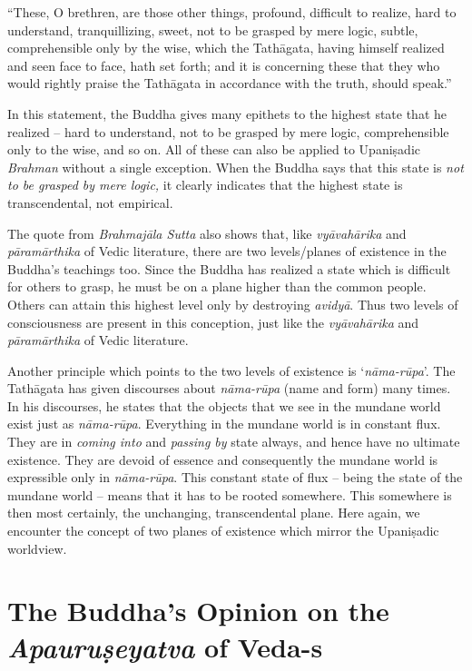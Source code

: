 \begin{myquote}
“These, O brethren, are those other things, profound, difficult to realize, hard to understand, tranquillizing, sweet, not to be grasped by mere logic, subtle, comprehensible only by the wise, which the Tathāgata, having himself realized and seen face to face, hath set forth; and it is concerning these that they who would rightly praise the Tathāgata in accordance with the truth, should speak.”
\end{myquote}

In this statement, the Buddha gives many epithets to the highest state that he realized – hard to understand, not to be grasped by mere logic, comprehensible only to the wise, and so on. All of these can also be applied to Upaniṣadic \textit{Brahman} without a single exception. When the Buddha says that this state is \textit{not to be grasped by mere logic,} it clearly indicates that the highest state is transcendental, not empirical.

The quote from \textit{Brahmajāla Sutta} also shows that, like \textit{vyāvahārika} and \textit{pāramārthika} of Vedic literature, there are two levels/planes of existence in the Buddha’s teachings too. Since the Buddha has realized a state which is difficult for others to grasp, he must be on a plane higher than the common people. Others can attain this highest level only by destroying \textit{avidyā}. Thus two levels of consciousness are present in this conception, just like the \textit{vyāvahārika} and \textit{pāramārthika} of Vedic literature.

Another principle which points to the two levels of existence is ‘\textit{nāma-rūpa}’. The Tathāgata has given discourses about \textit{nāma-rūpa} (name and form) many times. In his discourses, he states that the objects that we see in the mundane world exist just as \textit{nāma-rūpa}. Everything in the mundane world is in constant flux. They are in \textit{coming into} and \textit{passing by} state always, and hence have no ultimate existence. They are devoid of essence and consequently the mundane world is expressible only in \textit{nāma-rūpa}. This constant state of flux – being the state of the mundane world – means that it has to be rooted somewhere. This somewhere is then most certainly, the unchanging, transcendental plane. Here again, we encounter the concept of two planes of existence which mirror the Upaniṣadic worldview.


\section*{The Buddha's Opinion on \hfill\break the \textit{Apauruṣeyatva} of Veda-s}

